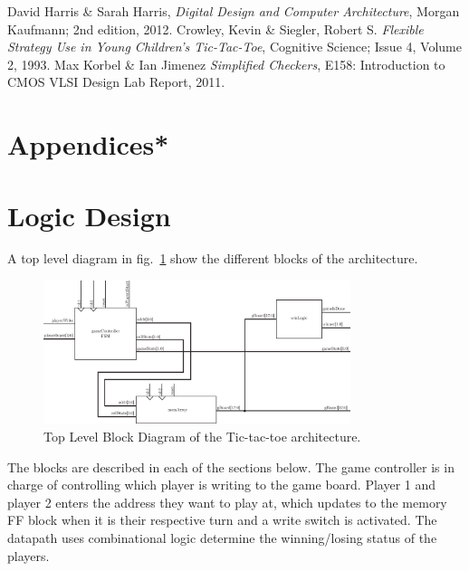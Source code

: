 \documentclass[]{article}
\begin{document}
\begin{thebibliography}{widest entry}
  David Harris \& Sarah Harris,
  \emph{Digital Design and Computer Architecture},
  Morgan Kaufmann; 2nd edition,
  2012.
 Crowley, Kevin \& Siegler, Robert S.
  \emph{Flexible Strategy Use in Young Children's Tic-Tac-Toe},
  Cognitive Science; Issue 4, Volume 2,
  1993.
 Max Korbel \& Ian Jimenez
  \emph{Simplified Checkers},
  E158: Introduction to CMOS VLSI Design Lab Report,
  2011. 

\end{thebibliography}


\section{Appendices*}
\appendix


\section{Logic Design}
A top level diagram in fig.~\ref{fig:top-level} show the different blocks of the architecture.

\begin{figure}
\centering
\includegraphics[width=0.8\textwidth]{top-level}
\caption{Top Level Block Diagram of the Tic-tac-toe architecture.}
\label{fig:top-level}
\end{figure}
The blocks are described in each of the sections below. The game controller is in charge of controlling which player is writing to the game board. Player 1 and player 2 enters the address they want to play at, which updates to the memory FF block when it is their respective turn and a write switch is activated. The datapath uses combinational logic determine the winning/losing status of the players.
\end{document}
